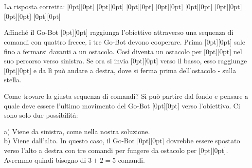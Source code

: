 {{\section*{\BrochureSolution}
La risposta corretta:
\raisebox{-0.5ex}[0pt][0pt]{} \raisebox{-0.5ex}[0pt][0pt]{} \raisebox{-0.5ex}[0pt][0pt]{} \raisebox{-0.5ex}[0pt][0pt]{} \raisebox{-0.5ex}[0pt][0pt]{} \raisebox{-0.5ex}[0pt][0pt]{} \raisebox{-0.5ex}[0pt][0pt]{} \raisebox{-0.5ex}[0pt][0pt]{}

Affinché il Go-Bot \raisebox{-0.5ex}[0pt][0pt]{} raggiunga l’obiettivo attraverso una sequenza di comandi con quattro frecce, i tre Go-Bot devono cooperare.
Prima \raisebox{-0.5ex}[0pt][0pt]{} sale fino a fermarsi davanti a un ostacolo.
Così diventa un ostacolo per \raisebox{-0.5ex}[0pt][0pt]{} nel suo percorso verso sinistra.
Se ora si invia \raisebox{-0.5ex}[0pt][0pt]{} verso il basso, esso raggiunge \raisebox{-0.5ex}[0pt][0pt]{} e da lì può andare a destra,
dove si ferma prima dell’ostacolo - sulla stella.

{\centering%
\par}

Come trovare la giusta sequenza di comandi?  Si può partire dal fondo e pensare a quale deve essere l’ultimo movimento del Go-Bot \raisebox{-0.5ex}[0pt][0pt]{} verso l’obiettivo. Ci sono solo due possibilità:

a) Viene da sinistra, come nella nostra soluzione. \\
b) Viene dall’alto. In questo caso, il Go-Bot \raisebox{-0.5ex}[0pt][0pt]{} dovrebbe essere spostato verso l’alto a destra con tre comandi per fungere da ostacolo per \raisebox{-0.5ex}[0pt][0pt]{}. Avremmo quindi bisogno di ${3 + 2 = 5}$ comandi.

}}

